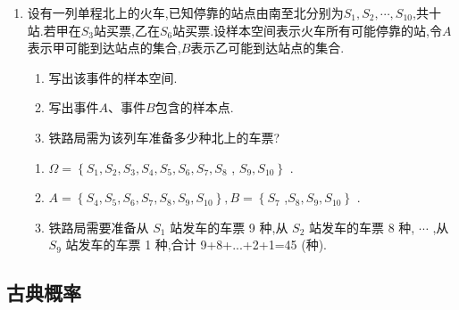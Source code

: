 \begin{enumerate}
\item 设有一列单程北上的火车,已知停靠的站点由南至北分别为$S_{1}, S_{2}, \cdots, S_{10}$,共十站.若甲在$S_3$站买票,乙在$S_6$站买票.设样本空间表示火车所有可能停靠的站,令$A$表示甲可能到达站点的集合,$B$表示乙可能到达站点的集合.
\begin{enumerate}
\item 写出该事件的样本空间.
\item 写出事件$A$、事件$B$包含的样本点.
\item 铁路局需为该列车准备多少种北上的车票?
\end{enumerate}
\begin{jieda}
    \begin{enumerate}
        \item $\Omega  = \left\{  {{S}_{1},{S}_{2},{S}_{3},{S}_{4},{S}_{5},{S}_{6},{S}_{7},{S}_{8}}\right.$ ,
$\left. {{S}_{9},{S}_{10}}\right\}$ .
        \item $A = \left\{  {{S}_{4},{S}_{5},{S}_{6},{S}_{7},{S}_{8},{S}_{9},{S}_{10}}\right\}  ,B = \left\{  {S}_{7}\right.$ ,$\left. {{S}_{8},{S}_{9},{S}_{10}}\right\}$ .
        \item 铁路局需要准备从 ${S}_{1}$ 站发车的车票 9 种,从 ${S}_{2}$ 站发车的车票 8 种, $\cdots$ ,从 ${S}_{9}$ 站发车的车票 1 种,合计 9+8+...+2+1=45 (种).
    \end{enumerate}
\end{jieda}

    
\end{enumerate}


\clearpage

\subsection*{古典概率}

